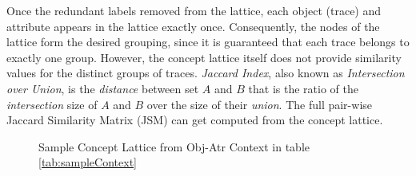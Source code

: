 Once the redundant labels removed from the lattice, each object (trace) and attribute appears in the lattice exactly once. Consequently, the nodes of the lattice form the desired grouping, since it is guaranteed that each trace belongs to exactly one group. However, the concept lattice itself does not provide similarity values for the distinct groups of traces. \textit{Jaccard Index}, also known as \textit{Intersection over Union}, is the \textit{distance} between set $A$ and $B$ that is the ratio of the \textit{intersection} size of $A$ and $B$ over the size of their \textit{union}.  The full pair-wise Jaccard Similarity Matrix (JSM) can get computed from the concept lattice.
%




\begin{figure}[t]
\centering
{}
\caption{Sample Concept Lattice from Obj-Atr Context in table \ref{tab:sampleContext}}
\label{fig:sampleCL}
\end{figure}



